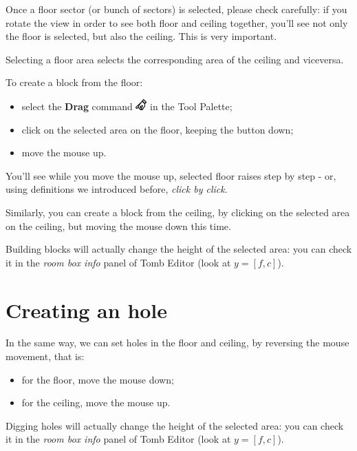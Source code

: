 Once a floor sector (or bunch of sectors) is selected, please check carefully: if you rotate the view in order to see both floor and ceiling together, you'll see not only the floor is selected, but also the ceiling. This is very important.

\begin{remark}
    Selecting a floor area selects the corresponding area of the ceiling and viceversa.
\end{remark}

To create a block from the floor:
\begin{itemize}
    \item select the \textbf{Drag} command \includegraphics[scale=0.5]{Resources/icons_toolbox/toolbox_Drag-16.png} in the Tool Palette;
    \item {} click on the selected area on the floor, keeping the button down;
    \item move the mouse up.
\end{itemize}

You'll see while you move the mouse up, selected floor raises step by step - or, using definitions we introduced before, \emph{click by click}.

\par Similarly, you can create a block from the ceiling, by clicking on the selected area on the ceiling, but moving the mouse down this time.

\par Building blocks will actually change the height of the selected area: you can check it in the \emph{room box info} panel of Tomb Editor (look at \( y = [f, c] \)).

\section{Creating an hole}

In the same way, we can set holes in the floor and ceiling, by reversing the mouse movement, that is:
\begin{itemize}
    \item for the floor, move the mouse down;
    \item for the ceiling, move the mouse up.
\end{itemize}

\par Digging holes will actually change the height of the selected area: you can check it in the \emph{room box info} panel of Tomb Editor (look at \( y = [f, c] \)).

